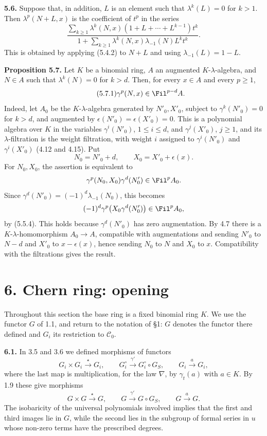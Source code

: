 \textbf{5.6.} Suppose that, in addition, \(L\) is an element such that \(\lambda^k(L)=0\) for \(k>1\). Then \(\lambda^p(N+L,x)\) is the coefficient of \(t^p\) in the series
\begin{equation}\tag{5.6.1}
  \frac{\displaystyle\sum_{k\ge1}\lambda^k(N,x)
        (1+L+\cdots+L^{k-1})t^k}
       {\displaystyle 1+\sum_{k\ge1}\lambda^k(N,x)
        \lambda_{-1}(N)L^k t^k}.
\end{equation}
This is obtained by applying (5.4.2) to \(N+L\) and using \(\lambda_{-1}(L)=1-L\).

\textbf{Proposition 5.7.} Let \(K\) be a binomial ring, \(A\) an augmented \(K\)-\(\lambda\)-algebra, and \(N\in A\) such that \(\lambda^k(N)=0\) for \(k>d\). Then, for every \(x\in A\) and every \(p\ge1\),
\begin{equation}\tag{5.7.1}
  \gamma^p(N,x)\in\Fil^{p-d}A.
\end{equation}
Indeed, let \(A_0\) be the \(K\)-\(\lambda\)-algebra generated by \(N'_0,X'_0\), subject to \(\gamma^k(N'_0)=0\) for \(k>d\), and augmented by \(\epsilon(N'_0)=\epsilon(X'_0)=0\). This is a polynomial algebra over \(K\) in the variables \(\gamma^i(N'_0)\), \(1\le i\le d\), and \(\gamma^j(X'_0)\), \(j\ge1\), and its \(\lambda\)-filtration is the weight filtration, with weight \(i\) assigned to \(\gamma^i(N'_0)\) and \(\gamma^i(X'_0)\) (4.12 and 4.15). Put
\[
  N_0=N'_0+d,
  \qquad X_0=X'_0+\epsilon(x).
\]
For \(N_0,X_0\), the assertion is equivalent to
\[
  \gamma^p(N_0,X_0)\gamma^d(N'_0)\in\Fil^pA_0.
\]
Since \(\gamma^d(N'_0)=(-1)^d\lambda_{-1}(N_0)\), this becomes
\[
  (-1)^d\gamma^p\bigl(X_0\gamma^d(N'_0)\bigr)\in\Fil^pA_0,
\]
by (5.5.4). This holds because \(\gamma^d(N'_0)\) has zero augmentation. By 4.7 there is a \(K\)-\(\lambda\)-homomorphism \(A_0\to A\), compatible with augmentations and sending \(N'_0\) to \(N-d\) and \(X'_0\) to \(x-\epsilon(x)\), hence sending \(N_0\) to \(N\) and \(X_0\) to \(x\). Compatibility with the filtrations gives the result.

\section*{6. Chern ring: opening}

Throughout this section the base ring is a fixed binomial ring \(K\). We use the functor \(G\) of 1.1, and return to the notation of §1: \(G\) denotes the functor there defined and \(G_i\) its restriction to \(\mathscr C_0\).

\textbf{6.1.} In 3.5 and 3.6 we defined morphisms of functors
\[
  G_i\times G_i\xrightarrow{\star}G_i,
  \qquad
  G_i^\circ\xrightarrow{\gamma'}G_i^\circ\circ G_S,
  \qquad
  G_i\xrightarrow{a}G_i,
\]
where the last map is multiplication, for the law \(\nabla\), by \(\gamma_t(a)\) with \(a\in K\). By 1.9 these give morphisms
\[
  G\times G\xrightarrow{\star}G,
  \qquad
  G\xrightarrow{\gamma'}G\circ G_S,
  \qquad
  G\xrightarrow{a}G.
\]
The isobaricity of the universal polynomials involved implies that the first and third images lie in \(G\), while the second lies in the subgroup of formal series in \(u\) whose non-zero terms have the prescribed degrees.




